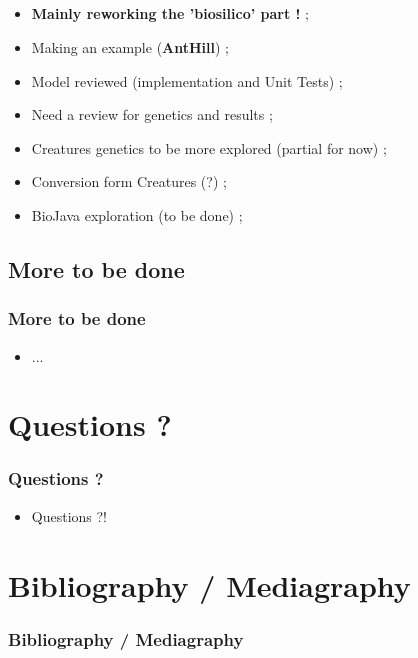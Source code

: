 \documentclass{beamer}
\begin{document}
\subsection{ \titleSubSectionThirdPartTwo }
\begin{frame}
	\frametitle{ \titleSubSectionThirdPartTwo }
	\begin{itemize}
		\item \textbf{Mainly reworking the 'biosilico' part !} ; 
		\item Making an example (\textbf{AntHill}) ; 
		\item Model reviewed (implementation and Unit Tests) ; 
		\item Need a review for genetics and results ; 
		\item Creatures genetics to be more explored (partial for now) ; 
		\item Conversion form Creatures (?) ; 
		\item BioJava exploration (to be done) ; 
	\end{itemize}
\end{frame}

\def\titleSubSectionThirdPartThree{ More to be done }
\subsection{ \titleSubSectionThirdPartThree }
\begin{frame}
	\frametitle{ \titleSubSectionThirdPartThree }
	\begin{itemize}
		\item ... 
	\end{itemize}
\end{frame}


\def\sectionPartQuestions{Questions ?}
\section{\sectionPartQuestions}
\begin{frame}
	\frametitle{\sectionPartQuestions}
	\begin{itemize}
		\item Questions ?!
	\end{itemize}
\end{frame}

\def\sectionPartBibliographie{Bibliography / Mediagraphy}
\section{\sectionPartBibliographie}
\begin{frame}
	\frametitle{\sectionPartBibliographie}
	\nocite{*}
	
	
\end{frame}
\end{document}
